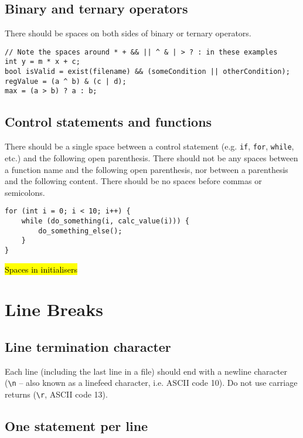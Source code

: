 \documentclass{article}
\begin{document}
\subsection{Binary and ternary operators}
There should be spaces on both sides of binary or ternary operators.

\nolinenumbers
{}
\begin{lstlisting}
// Note the spaces around * + && || ^ & | > ? : in these examples
int y = m * x + c;
bool isValid = exist(filename) && (someCondition || otherCondition);
regValue = (a ^ b) & (c | d);
max = (a > b) ? a : b;
\end{lstlisting}
\linenumbers

\subsection{Control statements and functions}
There should be a single space between a control statement (e.g. \texttt{if}, \texttt{for}, \texttt{while}, etc.) and 
the following open parenthesis. There should not be any spaces between a function name and the following open parenthesis, nor between a parenthesis and the following content. There should be no spaces before commas or semicolons. 

\nolinenumbers
{}
\begin{lstlisting}
for (int i = 0; i < 10; i++) {
    while (do_something(i, calc_value(i))) {
        do_something_else();
    }
}
\end{lstlisting}
\linenumbers

\hl{Spaces in initialisers}

\section{Line Breaks}
\subsection{Line termination character}
Each line (including the last line in a file) should end with a newline character (\texttt{\textbackslash n} -- also known as a linefeed character, i.e. ASCII code 10). Do not use carriage returns (\texttt{\textbackslash r}, ASCII code 13).

\subsection{One statement per line}
\end{document}

